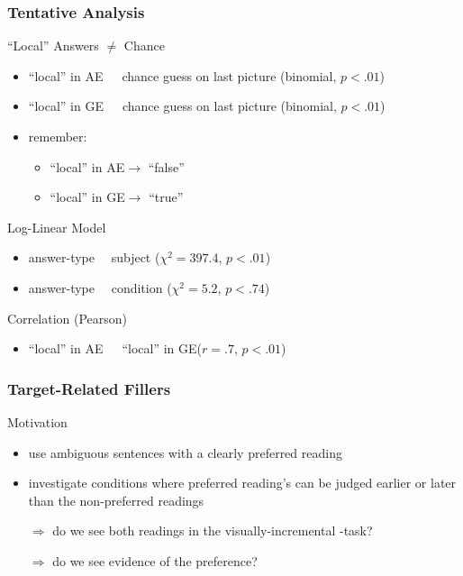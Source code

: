 \documentclass[fleqn,10pt,serif,xcolor=dvipsnames]{beamer}
\renewcommand{\AE}{AE\xspace}
\newcommand{\GE}{GE\xspace}
\begin{document}
\begin{frame}
  \frametitle{Tentative Analysis}

  \begin{block}{``Local'' Answers $\neq$ Chance}
    \begin{itemize}
    \item ``local'' in \AE\ \ \urltilde \ chance guess on last picture
      \hfill (binomial, $p < .01$)
    \item ``local'' in \GE\ \ \urltilde \ chance guess on last picture
      \hfill (binomial, $p < .01$)
      \item remember:
        \begin{itemize}
        \item ``local'' in \AE $\rightarrow$ ``false''
        \item ``local'' in \GE $\rightarrow$ ``true''
        \end{itemize}
    \end{itemize}
  \end{block}

  
  \begin{block}{Log-Linear Model}
      \begin{itemize}
  \item answer-type \ \urltilde \ subject \hfill ($\chi^2
    =397.4$, $p < .01$)
  \item answer-type \ \urltilde \ condition \hfill ($\chi^2
    = 5.2$, $p < .74$)
  \end{itemize}
  \end{block}

  \begin{block}{Correlation \hfill (Pearson)}
    \begin{itemize}
    \item ``local'' in \AE\ \ \urltilde \  ``local'' in \GE \hfill ($r = .7$, $p < .01$)
    \end{itemize}
  \end{block}


\end{frame}

\begin{frame}
  \frametitle{Target-Related Fillers}
  \begin{block}{Motivation}
    \begin{itemize}
    \item use ambiguous sentences with a clearly preferred reading
    \item investigate conditions where preferred reading's 
      can be judged earlier or later than the non-preferred readings 
    \item[$\Rightarrow$] do we see both readings in the visually-incremental
      -task?
    \item[$\Rightarrow$] do we see evidence of the preference?
    \end{itemize}
  \end{block}
\end{frame}
\end{document}
